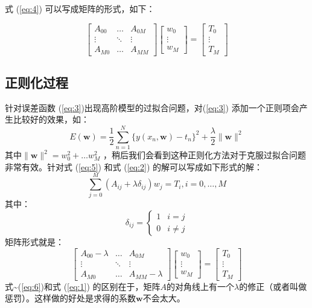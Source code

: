 \documentclass[10pt,a4paper,UTF8]{article}
\begin{document}
式 (\ref{eq:4}) 可以写成矩阵的形式，如下：

\begin{equation}
\label{eq:1}
\begin{bmatrix}
A_{00} & \ldots & A_{0M}\\
\vdots & \ddots & \vdots \\
A_{M0} & \ldots & A_{MM}
\end{bmatrix}
\begin{bmatrix}
w_{0} \\ \vdots \\ w_{M}
\end{bmatrix}
=
\begin{bmatrix}
T_{0} \\ \vdots \\ T_{M}
\end{bmatrix}
\end{equation}

\subsection{正则化过程}
\label{sec:orgd072833}


针对误差函数 (\ref{eq:3})出现高阶模型的过拟合问题，对(\ref{eq:3}) 添加一个正则项会产生比较好的效果，如：
\begin{equation}
\label{eq:5}
E( \mathbf{w}) = \frac{1}{2} \sum_{n=1}^{N}\{y(x_{n}, \mathbf{w}) - t_{n}\}^{2} + \frac{\lambda}{2} \| \mathbf{w} \|^{2}
\end{equation}
其中\(\| \mathbf{w} \|^{2} = w_{0}^{2} +　\ldots w_{M}^{2}\) ，稍后我们会看到这种正则化方法对于克服过拟合问题非常有效。针对式 (\ref{eq:5}) 和式 (\ref{eq:2}) 的解可以写成如下形式的解：
\begin{equation}
\label{eq:7}
\sum_{j=0}^{M}(A_{ij} + \lambda \delta_{ij})w_{j} = T_{i}, i = 0,\ldots ,M
\end{equation}
其中：
\begin{equation}
\label{eq:8}
\delta_{ij} =
\begin{cases}
1 & i = j \\
0 & i\neq j
\end{cases}
\end{equation}
矩阵形式就是：
\begin{equation}
\label{eq:6}
\begin{bmatrix}
A_{00} - \lambda  & \ldots & A_{0M}\\
\vdots & \ddots & \vdots \\
A_{M0} & \ldots & A_{MM} - \lambda
\end{bmatrix}
\begin{bmatrix}
w_{0} \\ \vdots \\ w_{M}
\end{bmatrix}
=
\begin{bmatrix}
T_{0} \\ \vdots \\ T_{M}
\end{bmatrix}
\end{equation}
式\textasciitilde{}(\ref{eq:6})和式 (\ref{eq:1}) 的区别在于，矩阵\(A\)的对角线上有一个\(\lambda\)的修正（或者叫做惩罚）。这样做的好处是求得的系数\(\mathbf{w}\)不会太大。
\end{document}
